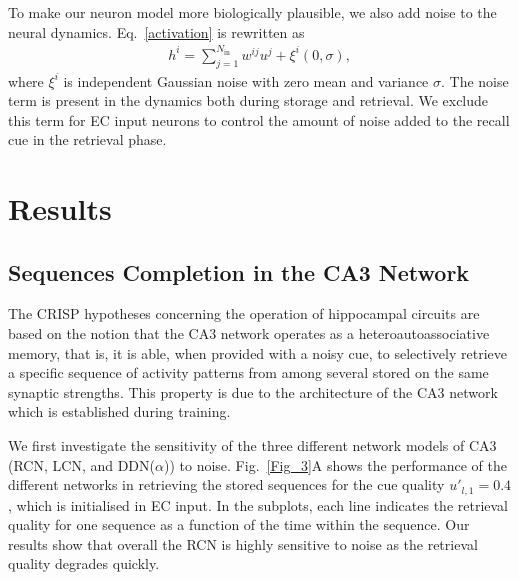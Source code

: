 \documentclass[utf8]{frontiersSCNS} %
\begin{document}
To make our neuron model more biologically plausible, we also add noise to the neural dynamics. Eq.~\ref{activation} is rewritten as
\begin{align}
\label{dynamic-noise}
h^i = \sum_{j=1}^{N_\mathrm{in}} w^{ij}u^j + \xi ^i (0,\sigma),
\end{align}  
where $\xi^i$ is independent Gaussian noise with zero mean and variance $\sigma$. The noise term is present in the dynamics both during storage and retrieval. We exclude this term for EC input neurons to control the amount of noise added to the recall cue in the retrieval phase.


\section{Results}
\subsection{Sequences Completion in the CA3 Network}

The CRISP hypotheses concerning the operation of hippocampal circuits are based on the notion that the CA3 network operates as a heteroautoassociative memory, that is, it is able, when provided with a noisy cue, to selectively retrieve a specific sequence of activity patterns from among several stored on the same synaptic strengths. This property is due to the architecture of the CA3 network which is established during training. 

We first investigate the sensitivity of the three different network models of CA3 (RCN, LCN, and DDN($\alpha$)) to noise. Fig.~\ref{Fig_3}A shows the performance of the different networks in retrieving the stored sequences for the cue quality $u'_{l, 1} = 0.4$, which is initialised in EC input. In the subplots, each line indicates the retrieval quality for one sequence as a function of the time within the sequence. Our results show that overall the RCN is highly sensitive to noise as the retrieval quality degrades quickly.  

\end{document}
